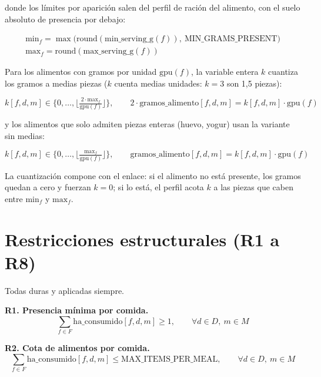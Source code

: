 donde los límites por aparición salen del perfil de ración del alimento, con el suelo absoluto de presencia por debajo:

\begin{gather*}
\text{min}_f = \max\big(\text{round}(\text{min\_serving\_g}(f)),\ \text{MIN\_GRAMS\_PRESENT}\big) \\
\text{max}_f = \text{round}(\text{max\_serving\_g}(f))
\end{gather*}

Para los alimentos con gramos por unidad $\text{gpu}(f)$, la variable entera $k$ cuantiza los gramos a medias piezas ($k$ cuenta medias unidades: $k = 3$ son 1,5 piezas):

\begin{equation*}
k[f,d,m] \in \Big\{0, \dots, \Big\lfloor \tfrac{2 \cdot \text{max}_f}{\text{gpu}(f)} \Big\rfloor\Big\}, \qquad 2 \cdot \text{gramos\_alimento}[f,d,m] = k[f,d,m] \cdot \text{gpu}(f)
\end{equation*}

y los alimentos que solo admiten piezas enteras (huevo, yogur) usan la variante sin medias:

\begin{equation*}
k[f,d,m] \in \Big\{0, \dots, \Big\lfloor \tfrac{\text{max}_f}{\text{gpu}(f)} \Big\rfloor\Big\}, \qquad \text{gramos\_alimento}[f,d,m] = k[f,d,m] \cdot \text{gpu}(f)
\end{equation*}

La cuantización compone con el enlace: si el alimento no está presente, los gramos quedan a cero y fuerzan $k = 0$; si lo está, el perfil acota $k$ a las piezas que caben entre $\text{min}_f$ y $\text{max}_f$.

\section{Restricciones estructurales (R1 a R8)}
\label{sec:anexoEstructurales}

Todas duras y aplicadas siempre.

\textbf{R1. Presencia mínima por comida.}
\begin{equation*}
\sum_{f \in F} \text{ha\_consumido}[f,d,m] \ge 1, \qquad \forall d \in D,\ m \in M
\end{equation*}

\textbf{R2. Cota de alimentos por comida.}
\begin{equation*}
\sum_{f \in F} \text{ha\_consumido}[f,d,m] \le \text{MAX\_ITEMS\_PER\_MEAL}, \qquad \forall d \in D,\ m \in M
\end{equation*}


